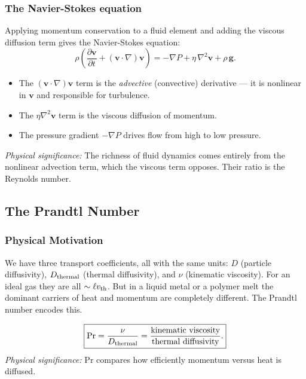 \subsubsection*{The Navier-Stokes equation}
Applying momentum conservation to a fluid element and adding the viscous
diffusion term gives the Navier-Stokes equation:
\begin{equation}
    \boxed{
    \rho\left(\frac{\partial \mathbf{v}}{\partial t}
    + (\mathbf{v}\cdot\nabla)\mathbf{v}\right)
    = -\nabla P + \eta\,\nabla^2\mathbf{v} + \rho\,\mathbf{g} .
    }
    \label{eq:lec06:navier-stokes}
\end{equation}
\begin{itemize}
    \item The $(\mathbf{v}\cdot\nabla)\mathbf{v}$ term is the \emph{advective}
    (convective) derivative — it is nonlinear in $\mathbf{v}$ and
    responsible for turbulence.
    \item The $\eta\nabla^2\mathbf{v}$ term is the viscous diffusion of
    momentum.
    \item The pressure gradient $-\nabla P$ drives flow from high to low
    pressure.
\end{itemize}
\textit{Physical significance:} The richness of fluid dynamics comes entirely
from the nonlinear advection term, which the viscous term opposes. Their ratio
is the Reynolds number.

\subsection{The Prandtl Number}
\label{sec:lec06:prandtl}

\subsubsection*{Physical Motivation}
We have three transport coefficients, all with the same units: $D$ (particle
diffusivity), $D_{\rm thermal}$ (thermal diffusivity), and $\nu$ (kinematic
viscosity). For an ideal gas they are all $\sim \ell v_{\rm th}$. But in a
liquid metal or a polymer melt the dominant carriers of heat and momentum are
completely different. The Prandtl number encodes this.

\begin{equation}
    \boxed{
    \mathrm{Pr} = \frac{\nu}{D_{\rm thermal}}
    = \frac{\text{kinematic viscosity}}{\text{thermal diffusivity}} .
    }
    \label{eq:lec06:prandtl}
\end{equation}
\textit{Physical significance:} $\mathrm{Pr}$ compares how efficiently
momentum versus heat is diffused.

